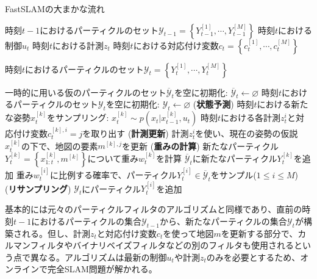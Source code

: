 \documentclass[dvipdfmx,a4paper]{jsarticle}
\begin{document}
\begin{algorithm}[H]
	\caption{FastSLAMの大まかな流れ}
	\label{alg:fast-slam-outline}
	\begin{algorithmic}[1]
		\Require
			\Statex 時刻$t - 1$におけるパーティクルのセット$\mathcal{Y}_{t - 1} = \left\{ Y_{t - 1}^{[1]}, \cdots, Y_{t - 1}^{[M]} \right\}$
			\Statex 時刻$t$における制御$u_t$
			\Statex 時刻$t$における計測$z_t$
			\Statex 時刻$t$における対応付け変数$c_t = \left\{ c_t^{[1]}, \cdots, c_t^{[M]} \right\}$

		\Ensure
			\Statex 時刻$t$におけるパーティクルのセット$\mathcal{Y}_t = \left\{ Y_t^{[1]}, \cdots, Y_t^{[M]} \right\}$ \newline
		
		\State 一時的に用いる仮のパーティクルのセット$\overline{\mathcal{Y}}_t$を空に初期化: $\overline{\mathcal{Y}}_t \leftarrow \varnothing$
		\State 時刻$t$におけるパーティクルのセット$\mathcal{Y}_t$を空に初期化: $\mathcal{Y}_t \leftarrow \varnothing$
			\State (\textbf{状態予測}) 時刻$t$における新たな姿勢$x_t^{[k]}$をサンプリング: $x_t^{[k]} \sim p(x_t | x_{t - 1}^{[k]}, u_t)$
				\State 時刻$t$における各計測$z_t^i$と対応付け変数$c_t^{[k], i} = j$を取り出す
				\State (\textbf{計測更新}) 計測$z_t^i$を使い、現在の姿勢の仮説$x_t^{[k]}$の下で、地図の要素$m^{[k], j}$を更新
			\EndFor
			\State (\textbf{重みの計算}) 新たなパーティクル$Y_t^{[k]} = \left\{ x_{1 : t}^{[k]}, m^{[k]} \right\}$について重み$w_t^{[k]}$を計算
			\State $\overline{\mathcal{Y}}_t$に新たなパーティクル$Y_t^{[k]}$を追加
		\EndFor
			\State 重み$w_t^{[i]}$に比例する確率で、パーティクル$Y_t^{[i]} \in \overline{\mathcal{Y}}_t$をサンプル($1 \le i \le M$)
			\State (\textbf{リサンプリング}) $\mathcal{Y}_t$にパーティクル$Y_t^{[i]}$を追加
		\EndFor
	\end{algorithmic}
\end{algorithm}

基本的には元々のパーティクルフィルタのアルゴリズムと同様であり、直前の時刻$t - 1$におけるパーティクルの集合$\mathcal{Y}_{t - 1}$から、新たなパーティクルの集合$\mathcal{Y}_t$が構築される。但し、計測$z_t$と対応付け変数$c_t$を使って地図$m$を更新する部分で、カルマンフィルタやバイナリベイズフィルタなどの別のフィルタも使用されるという点で異なる。アルゴリズムは最新の制御$u_t$や計測$z_t$のみを必要とするため、オンラインで完全SLAM問題が解かれる。
\end{document}
